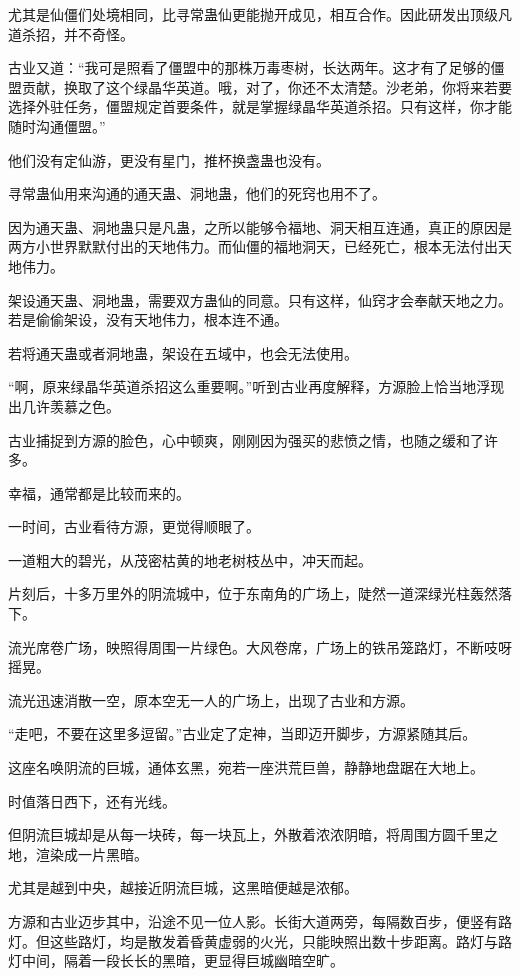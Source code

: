 \begin{this_body}
尤其是仙僵们处境相同，比寻常蛊仙更能抛开成见，相互合作。因此研发出顶级凡道杀招，并不奇怪。

古业又道：“我可是照看了僵盟中的那株万毒枣树，长达两年。这才有了足够的僵盟贡献，换取了这个绿晶华英道。哦，对了，你还不太清楚。沙老弟，你将来若要选择外驻任务，僵盟规定首要条件，就是掌握绿晶华英道杀招。只有这样，你才能随时沟通僵盟。”

他们没有定仙游，更没有星门，推杯换盏蛊也没有。

寻常蛊仙用来沟通的通天蛊、洞地蛊，他们的死窍也用不了。

因为通天蛊、洞地蛊只是凡蛊，之所以能够令福地、洞天相互连通，真正的原因是两方小世界默默付出的天地伟力。而仙僵的福地洞天，已经死亡，根本无法付出天地伟力。

架设通天蛊、洞地蛊，需要双方蛊仙的同意。只有这样，仙窍才会奉献天地之力。若是偷偷架设，没有天地伟力，根本连不通。

若将通天蛊或者洞地蛊，架设在五域中，也会无法使用。

“啊，原来绿晶华英道杀招这么重要啊。”听到古业再度解释，方源脸上恰当地浮现出几许羡慕之色。

古业捕捉到方源的脸色，心中顿爽，刚刚因为强买的悲愤之情，也随之缓和了许多。

幸福，通常都是比较而来的。

一时间，古业看待方源，更觉得顺眼了。

一道粗大的碧光，从茂密枯黄的地老树枝丛中，冲天而起。

片刻后，十多万里外的阴流城中，位于东南角的广场上，陡然一道深绿光柱轰然落下。

流光席卷广场，映照得周围一片绿色。大风卷席，广场上的铁吊笼路灯，不断吱呀摇晃。

流光迅速消散一空，原本空无一人的广场上，出现了古业和方源。

“走吧，不要在这里多逗留。”古业定了定神，当即迈开脚步，方源紧随其后。

这座名唤阴流的巨城，通体玄黑，宛若一座洪荒巨兽，静静地盘踞在大地上。

时值落日西下，还有光线。

但阴流巨城却是从每一块砖，每一块瓦上，外散着浓浓阴暗，将周围方圆千里之地，渲染成一片黑暗。

尤其是越到中央，越接近阴流巨城，这黑暗便越是浓郁。

方源和古业迈步其中，沿途不见一位人影。长街大道两旁，每隔数百步，便竖有路灯。但这些路灯，均是散发着昏黄虚弱的火光，只能映照出数十步距离。路灯与路灯中间，隔着一段长长的黑暗，更显得巨城幽暗空旷。


\end{this_body}
